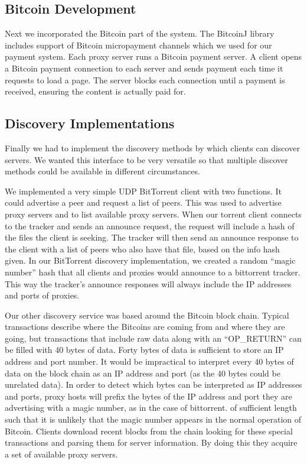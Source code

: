 \subsection{Bitcoin Development}
Next we incorporated the Bitcoin part of the system. The BitcoinJ library includes support of Bitcoin micropayment channels which we used for our payment system. Each proxy server runs a Bitcoin payment server. A client opens a Bitcoin payment connection to each server and sends payment each time it requests to load a page. The server blocks each connection until a payment is received, ensuring the content is actually paid for.

\subsection{Discovery Implementations}
Finally we had to implement the discovery methods by which clients can discover servers. We wanted this interface to be very versatile so that multiple discover methods could be available in different circumstances.

We implemented a very simple UDP BitTorrent client with two functions. It could advertise a peer and request a list of peers. This was used to advertise proxy servers and to list available proxy servers. When our torrent client connects to the tracker and sends an announce request, the request will include a hash of the files the client is seeking. The tracker will then send an announce response to the client with a list of peers who also have that file, based on the info hash given. In our BitTorrent discovery implementation, we created a random ``magic number'' hash that all clients and proxies would announce to a bittorrent tracker. This way the tracker's announce responses will always include the IP addresses and ports of proxies.

Our other discovery service was based around the Bitcoin block chain. Typical transactions describe where the Bitcoins are coming from and where they are going, but transactions that include raw data along with an ``OP\_RETURN'' can be filled with 40 bytes of data. Forty bytes of data is sufficient to store an IP address and port number. It would be impractical to interpret every 40 bytes of data on the block chain as an IP address and port (as the 40 bytes could be unrelated data). In order to detect which bytes can be interpreted as IP addresses and ports, proxy hosts will prefix the bytes of the IP address and port they are advertising with a magic number, as in the case of bittorrent. of sufficient length such that it is unlikely that the magic number appears in the normal operation of Bitcoin. Clients download recent blocks from the chain looking for these special transactions and parsing them for server information. By doing this they acquire a set of available proxy servers.
